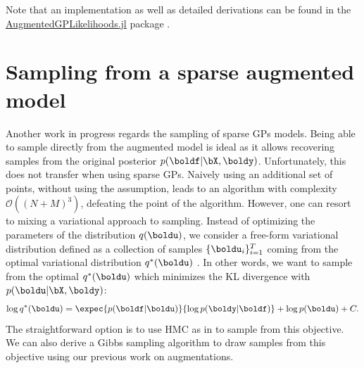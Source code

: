 
Note that an implementation as well as detailed derivations can be found in the \href{https://github.com/JuliaGaussianProcesses/AugmentedGPLikelihoods.jl}{AugmentedGPLikelihoods.jl} package \cite{theo_galy_fajou_2022_6347022}.

\section{Sampling from a sparse augmented model}

Another work in progress regards the sampling of sparse \ac{GPs} models.
Being able to sample directly from the augmented model is ideal as it allows recovering samples from the original posterior $p(\boldf|\bX,\boldy)$.
Unfortunately, this does not transfer when using sparse \ac{GPs}.
Naively using an additional set of points, without using the \citet{Titsias2009} assumption, leads to an algorithm with complexity $\mathcal{O}((N+M)^3)$, defeating the point of the algorithm.
However, one can resort to mixing a variational approach to sampling.
Instead of optimizing the parameters of the distribution $q(\boldu)$, we consider a free-form variational distribution defined as a collection of samples $\{\boldu_i\}_{i=1}^T$ coming from the optimal variational distribution $q^*(\boldu)$ \cite{hensmanMCMCVariationallySparse2015}.
In other words, we want to sample from the optimal $q^*(\boldu)$ which minimizes the \ac{KL} divergence with $p(\boldu|\bX,\boldy)$:
\begin{align*}
    \log q^*(\boldu) = \expec{p(\boldf|\boldu)}{\log p(\boldy|\boldf)} + \log p(\boldu) + C.
\end{align*}
The straightforward option is to use \ac{HMC} as in \cite{hensmanMCMCVariationallySparse2015} to sample from this objective.
We can also derive a Gibbs sampling algorithm to draw samples from this objective using our previous work on augmentations.

